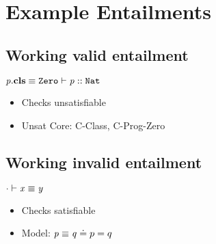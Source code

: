 \documentclass[a4paper]{article}
\begin{document}
\section{Example Entailments}
\subsection{Working valid entailment}
$\mathit{p}.\textbf{cls} \equiv \mathit{\mathtt{Zero}} \vdash \mathit{p} :: \mathit{\mathtt{Nat}}$
\begin{itemize}
  \item Checks unsatisfiable
  \item Unsat Core: C-Class, C-Prog-Zero
\end{itemize}

\subsection{Working invalid entailment}
$\cdot \vdash \mathit{x} \equiv \mathit{y}$
\begin{itemize}
  \item Checks satisfiable
  \item Model: $\mathit{p} \equiv \mathit{q} \doteq p=q$
\end{itemize}
\end{document}
